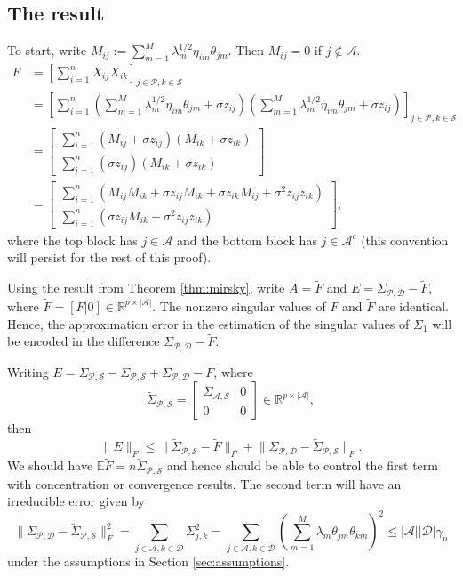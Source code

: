 \documentclass[11pt]{article}
\newcommand{\E}{\mathbb{E}}
\newcommand{\R}{\mathbb{R}}
\newcommand{\norm}[1]{\lVert #1 \rVert}
\newcommand{\A}{\mathcal{A}}
\renewcommand{\S}{\mathcal{S}}
\newcommand{\D}{\mathcal{D}}
\newcommand{\PP}{\mathcal{P}}
\begin{document}
\subsection{The result}
To start, write $M_{ij} :=  \sum_{m=1}^M \lambda_m^{1/2}\eta_{im} \theta_{jm}$.  Then $M_{ij} = 0$ if $j \notin \A$.
\begin{align}
F & = \left[\sum_{i=1}^n X_{ij} X_{ik}\right]_{j \in \PP, k \in \S}\\
& = \left[\sum_{i=1}^n(\sum_{m=1}^M \lambda_m^{1/2}\eta_{im} \theta_{jm} + \sigma z_{ij})
(\sum_{m=1}^M \lambda_m^{1/2}\eta_{im} \theta_{jm} + \sigma z_{ij})\right]_{j \in \PP, k \in \S} \\
& = 
\begin{bmatrix}
\sum_{i=1}^n(M_{ij} + \sigma z_{ij})(M_{ik} + \sigma z_{ik})\\
\sum_{i=1}^n(\sigma z_{ij})(M_{ik} + \sigma z_{ik})
\end{bmatrix} \\
& 
=
\begin{bmatrix}
\sum_{i=1}^n(M_{ij}M_{ik}+ \sigma z_{ij}M_{ik} + \sigma z_{ik}M_{ij} +  \sigma^2 z_{ij}z_{ik})\\
\sum_{i=1}^n( \sigma z_{ij}M_{ik} +  \sigma^2 z_{ij}z_{ik})
\end{bmatrix},
\end{align}
where the top block has $j \in \A$ and the bottom block has $j \in \A^c$ (this convention will persist for the rest of this proof).

Using the result from Theorem \ref{thm:mirsky}, write 
$A = \tilde{F}$  and $E = \Sigma_{\PP,\D} - \tilde{F}$, where $\tilde{F} = [F |  0] \in \R^{p \times |\A|}$.
The nonzero singular values of $F$ and $\tilde{F}$ are identical. 
 Hence, the approximation error in the estimation of the singular values of $\Sigma_1$  will be encoded
 in the difference $\Sigma_{\PP,\D} - \tilde{F}$.

Writing 
 $E = \tilde{\Sigma}_{\PP,\S} - \tilde{\Sigma}_{\PP,\S} + \Sigma_{\PP,\D} - \tilde{F}$, 
where 
\[
\tilde{\Sigma}_{\PP,\S} 
= 
\begin{bmatrix} 
\Sigma_{\A,\S} & 0 \\
0 & 0
\end{bmatrix}
\in
\R^{p \times |\A|},
\]  
then
\[
\norm{E}_F \leq \norm{\tilde{\Sigma}_{\PP,\S} - \tilde{F}}_F  + \norm{\Sigma_{\PP,\D} - \tilde{\Sigma}_{\PP,\S}}_F.
\]
We should have $\E \tilde{F} = n \tilde{\Sigma}_{\PP,\S}$ and hence should be able to control the first term with concentration or
convergence results.  The second term will have an irreducible error given by
\[
\norm{\Sigma_{\PP,\D} - \tilde{\Sigma}_{\PP,\S}}_F^2
= 
\sum_{j \in \A, k \in \D} \Sigma_{j,k}^2
= 
 \sum_{j \in \A, k \in \D}\left( \sum_{m=1}^M \lambda_m \theta_{jm}\theta_{km}\right)^2
 \leq
 |\A| |\D| \gamma_n
\]
under the assumptions in Section \ref{sec:assumptions}. 
\end{document}
